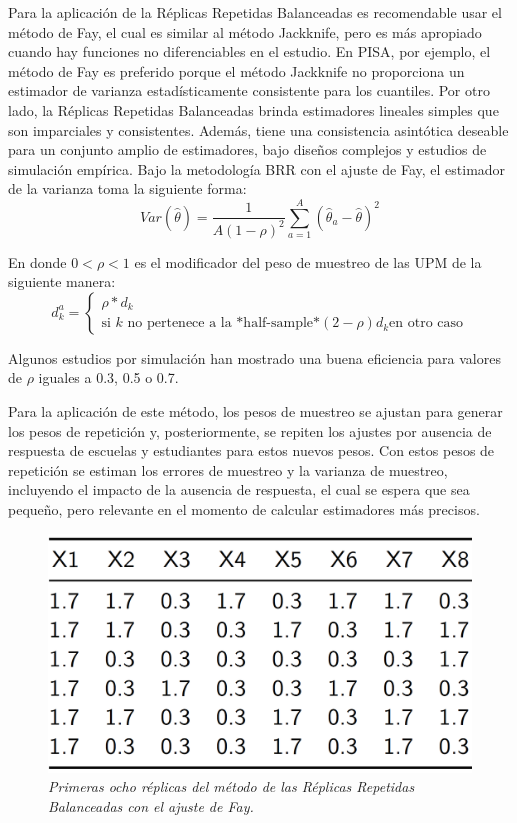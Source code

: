 \documentclass[
  12pt,
  spanish,
]{book}
\begin{document}
Para la aplicación de la Réplicas Repetidas Balanceadas es recomendable usar el método de Fay, el cual es similar al método Jackknife, pero es más apropiado cuando hay funciones no diferenciables en el estudio. En PISA, por ejemplo, el método de Fay es preferido porque el método Jackknife no proporciona un estimador de varianza estadísticamente consistente para los cuantiles. Por otro lado, la Réplicas Repetidas Balanceadas brinda estimadores lineales simples que son imparciales y consistentes. Además, tiene una consistencia asintótica deseable para un conjunto amplio de estimadores, bajo diseños complejos y estudios de simulación empírica. Bajo la metodología BRR con el ajuste de Fay, el estimador de la varianza toma la siguiente forma:
\[
Var(\hat{\theta}) = \frac{1}{A(1-\rho)^2}\sum_{a=1}^A(\hat{\theta}_a - \hat\theta )^2
\]

En donde \(0<\rho<1\) es el modificador del peso de muestreo de las UPM de la siguiente manera:
\[
d_k^a=
\begin{cases}
\rho*d_k\\ \text{si $k$ no pertenece a la *half-sample*}
(2-\rho)d_k \text{en otro caso}
\end{cases}
\]

Algunos estudios por simulación han mostrado una buena eficiencia para valores de \(\rho\) iguales a 0.3, 0.5 o 0.7.

Para la aplicación de este método, los pesos de muestreo se ajustan para generar los pesos de repetición y, posteriormente, se repiten los ajustes por ausencia de respuesta de escuelas y estudiantes para estos nuevos pesos. Con estos pesos de repetición se estiman los errores de muestreo y la varianza de muestreo, incluyendo el impacto de la ausencia de respuesta, el cual se espera que sea pequeño, pero relevante en el momento de calcular estimadores más precisos.

\begin{figure}
\centering
\includegraphics{Pics/22.png}
\caption{\emph{Primeras ocho réplicas del método de las Réplicas Repetidas Balanceadas con el ajuste de Fay.}}
\end{figure}
\end{document}
